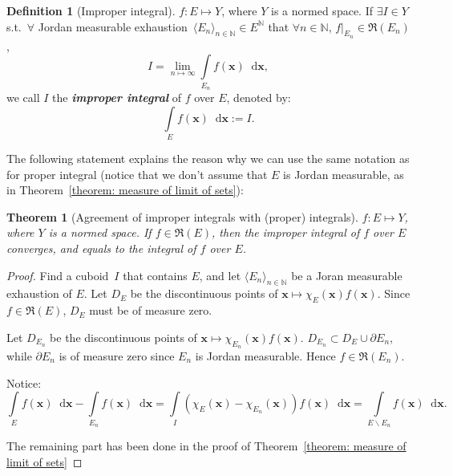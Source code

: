 \documentclass[openany]{book}
\newcommand*{\indexbf}[1]{\emph{\textbf{#1}}\index{#1}} %
\theoremstyle{plain}
\newtheorem{theorem}{Theorem}[section] %
\theoremstyle{definition}
\newtheorem{definition}{Definition}[section] %
\newcommand{\dif}{\mathop{}\!\mathrm{d}} %
\newcommand*{\bv}{\boldsymbol} %
\begin{document}
\begin{definition}[Improper integral]
	$f \colon E \mapsto Y$, where $Y$ is a normed space.
	If $\exists I \in Y$ s.t.\  $\forall$ Jordan measurable exhaustion~$\langle E_n \rangle_{n \in \mathbb N} \in E^\mathbb N$ that $\forall n \in \mathbb N$, $f|_{E_n} \in \mathfrak R(E_n)$, 
	\begin{equation*}
		I = \lim_{n \mapsto \infty} \int\limits_{E_n} f(\bv x) \dif \bv x,
	\end{equation*}
	we call $I$ the \indexbf{improper integral} of $f$ over $E$, denoted by:
	\begin{equation*}
		\int\limits_{E} f(\bv x) \dif \bv x := I.
	\end{equation*}
\end{definition}


The following statement explains the reason why we can use the same notation as for proper integral (notice that we don't assume that $E$ is Jordan measurable, as in Theorem~\ref{theorem: measure of limit of sets}):

\begin{theorem}[Agreement of improper integrals with (proper) integrals]
	\label{theorem: agreement of improper integrals with (proper) integrals}
	$f \colon E \mapsto Y$, where $Y$ is a normed space. 
	If $f \in \mathfrak R(E)$, then the improper integral of $f$ over $E$ converges, and equals to the integral of $f$ over $E$.
\end{theorem}
\begin{proof}
	Find a cuboid~$I$ that contains $E$, and let $\langle E_n \rangle_{n \in \mathbb N}$ be a Joran measurable exhaustion of $E$. 
	Let $D_E$ be the discontinuous points of $\bv x \mapsto \chi_E(\bv x) f(\bv x)$. Since $f \in \mathfrak R(E)$, $D_E$ must be of measure zero. 

	Let $D_{E_n}$ be the discontinuous points of $\bv x \mapsto \chi_{E_n}(\bv x) f(\bv x)$. 
	$D_{E_n} \subset D_E \cup \partial E_n$, while $\partial E_n$ is of measure zero since $E_n$ is Jordan measurable. 
	Hence $f \in \mathfrak R(E_n)$. 

	Notice:
	\begin{equation*}
		\int\limits_E f(\bv x) \dif \bv x - \int\limits_{E_n} f(\bv x) \dif \bv x
		= \int\limits_I (\chi_E(\bv x) - \chi_{E_n}(\bv x)) f(\bv x) \dif \bv x
		= \int\limits_{E \backslash E_n} f(\bv x) \dif \bv x.
	\end{equation*} 

	The remaining part has been done in the proof of Theorem~\ref{theorem: measure of limit of sets}
\end{proof}
\end{document}
